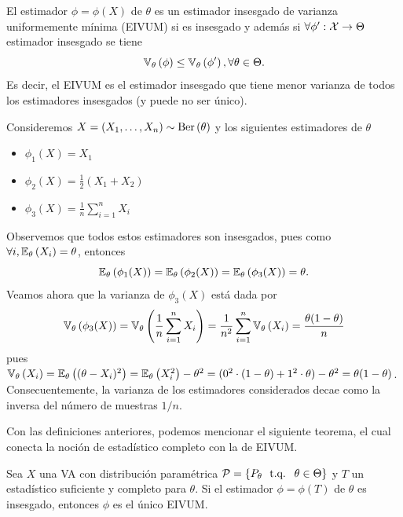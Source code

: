  \begin{definition}
  	El estimador $\phi=\phi(X)$ de $\theta$ es un estimador insesgado de varianza uniformemente mínima (EIVUM) si es insesgado y además si $\forall \phi':{\mathcal X}\rightarrow \Theta$ estimador insesgado se tiene
  	\begin{equation}
  		\mathbb{V}_\theta \left(\phi\right)\leq\mathbb{V}_\theta \left(\phi'\right), \forall \theta\in\Theta.
  	\end{equation}
  	Es decir, el EIVUM es el estimador insesgado que tiene menor varianza de todos los estimadores insesgados (y puede no ser único).
  \end{definition} 

\begin{example}
	Consideremos $X=(X_1,\ldots,X_n)\sim\text{Ber}\left(\theta\right)$ y los siguientes estimadores de $\theta$
	\begin{itemize}
		\item $\phi_1(X) = X_1$
		\item $\phi_2(X) = \frac{1}{2}(X_1+X_2)$
		\item $\phi_3(X) = \frac{1}{n}\sum_{i=1}^n X_i$
	\end{itemize}
	Observemos que todos estos estimadores son insesgados, pues como $\forall i, \mathbb{E}_\theta \left(X_i\right) = \theta$, entonces 
	\begin{equation}
		\mathbb{E}_\theta \left(\phi_1(X)\right) = \mathbb{E}_\theta \left(\phi_2(X)\right) = \mathbb{E}_\theta \left(\phi_3(X)\right) = \theta.
	\end{equation}
	Veamos ahora que la varianza de $\phi_3(X)$ está dada por
	\begin{equation}
		\mathbb{V}_\theta \left(\phi_3(X)\right) = \mathbb{V}_\theta \left(\frac{1}{n}\sum_{i=1}^n X_i\right) = \frac{1}{n^2}\sum_{i=1}^n \mathbb{V}_\theta \left(X_i\right) = \frac{\theta(1-\theta)}{n}
	\end{equation}
	pues $\mathbb{V}_\theta \left(X_i\right) = \mathbb{E}_\theta \left((\theta - X_i)^2\right) = \mathbb{E}_\theta \left(X_i^2\right) - \theta^2 = (0^2 \cdot (1-\theta) + 1^2 \cdot \theta) - \theta^2 = \theta(1-\theta)$. Consecuentemente, la varianza de los estimadores considerados decae como la inversa del número de muestras $1/n$.
\end{example}

Con las definiciones anteriores, podemos mencionar el siguiente teorema, el cual conecta la noción de estadístico completo con la de EIVUM. 

\begin{theorem}
	Sea $X$ una VA con distribución paramétrica $\mathcal{P} = \{P_\theta\ {\text{ t.q. }}\ \theta\in\Theta\}$ y $T$ un estadístico suficiente y completo para $\theta$. Si el estimador $\phi = \phi(T)$ de $\theta$ es insesgado, entonces $\phi$ es el único EIVUM. 
 \end{theorem} 
 
